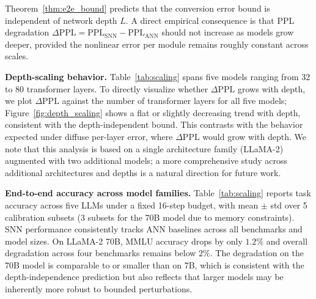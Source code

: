 \documentclass{article}
\theoremstyle{plain}
\theoremstyle{definition}
\theoremstyle{remark}
\begin{document}
Theorem~\ref{thm:e2e_bound} predicts that the conversion error bound is
independent of network depth $L$. A direct empirical consequence is that PPL
degradation $\Delta\mathrm{PPL} = \mathrm{PPL}_{\mathrm{SNN}} - \mathrm{PPL}_{\mathrm{ANN}}$
should not increase as models grow deeper, provided the nonlinear error per module
remains roughly constant across scales.

\noindent\textbf{Depth-scaling behavior.}
Table~\ref{tab:scaling} spans five models ranging from 32 to 80 transformer layers.
To directly visualize whether $\Delta\mathrm{PPL}$ grows with depth, we plot
$\Delta\mathrm{PPL}$ against the number of transformer layers for all five models;
Figure~\ref{fig:depth_scaling} shows a flat or slightly decreasing trend with depth,
consistent with the depth-independent bound. This contrasts with the behavior
expected under diffuse per-layer error, where $\Delta\mathrm{PPL}$ would grow with
depth. We note that this analysis is based on a single architecture family
(LLaMA-2) augmented with two additional models; a more comprehensive study across
additional architectures and depths is a natural direction for future work.

\noindent\textbf{End-to-end accuracy across model families.}
Table~\ref{tab:scaling} reports task accuracy across five LLMs under a fixed 16-step
budget, with mean $\pm$ std over 5 calibration subsets (3 subsets for the 70B model
due to memory constraints). SNN performance consistently tracks ANN baselines across
all benchmarks and model sizes. On LLaMA-2 70B, MMLU accuracy drops by only $1.2\%$
and overall degradation across four benchmarks remains below $2\%$. The degradation
on the 70B model is comparable to or smaller than on 7B, which is consistent with
the depth-independence prediction but also reflects that larger models may be
inherently more robust to bounded perturbations.
\end{document}
